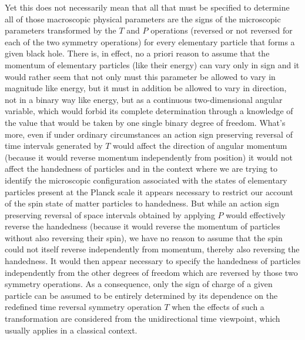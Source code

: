 \documentclass[notitlepage,12pt]{report}
\begin{document}
Yet this does not necessarily mean that all that must be specified to determine all of those macroscopic physical parameters are the signs of the microscopic parameters transformed by the $T$ and $P$ operations (reversed or not reversed for each of the two symmetry operations) for every elementary particle that forms a given black hole. There is, in effect, no a priori reason to assume that the momentum of elementary particles (like their energy) can vary only in sign and it would rather seem that not only must this parameter be allowed to vary in magnitude like energy, but it must in addition be allowed to vary in direction, not in a binary way like energy, but as a continuous two-dimensional angular variable, which would forbid its complete determination through a knowledge of the value that would be taken by one single binary degree of freedom. What's more, even if under ordinary circumstances an action sign preserving reversal of time intervals generated by $T$ would affect the direction of angular momentum (because it would reverse momentum independently from position) it would not affect the handedness of particles and in the context where we are trying to identify the microscopic configuration associated with the states of elementary particles present at the Planck scale it appears necessary to restrict our account of the spin state of matter particles to handedness. But while an action sign preserving reversal of space intervals obtained by applying $P$ would effectively reverse the handedness (because it would reverse the momentum of particles without also reversing their spin), we have no reason to assume that the spin could not itself reverse independently from momentum, thereby also reversing the handedness. It would then appear necessary to specify the handedness of particles independently from the other degrees of freedom which are reversed by those two symmetry operations. As a consequence, only the sign of charge of a given particle can be assumed to be entirely determined by its dependence on the redefined time reversal symmetry operation $T$ when the effects of such a transformation are considered from the unidirectional time viewpoint, which usually applies in a classical context.
\end{document}
